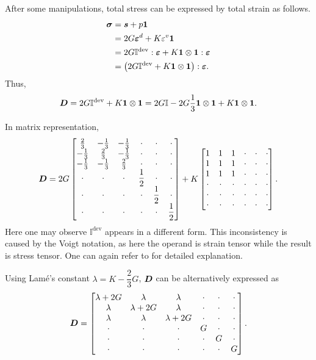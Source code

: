 After some manipulations, total stress can be expressed by total strain as follows.
\begin{gather}
\begin{split}
\bm{\sigma}&=\bm{s}+p\bm{1}\\
&=2G\bm{\varepsilon}^d+K\varepsilon^v\bm{1}\\
&=2G\mathbb{I}^\text{dev}:\bm{\varepsilon}+K\bm{1}\otimes\bm{1}:\bm{\varepsilon}\\
&=\left(2G\mathbb{I}^\text{dev}+K\bm{1}\otimes\bm{1}\right):\bm{\varepsilon}.
\end{split}
\end{gather}
Thus,
\begin{gather}
\bm{D}=2G\mathbb{I}^\text{dev}+K\bm{1}\otimes\bm{1}=2G\mathbb{I}-2G\dfrac{1}{3}\bm{1}\otimes\bm{1}+K\bm{1}\otimes\bm{1}.
\end{gather}

In matrix representation,
\begin{gather}
\bm{D}=2G\begin{bmatrix}
\frac{2}{3}&-\frac{1}{3}&-\frac{1}{3}&\cdot&\cdot&\cdot\\
-\frac{1}{3}&\frac{2}{3}&-\frac{1}{3}&\cdot&\cdot&\cdot\\
-\frac{1}{3}&-\frac{1}{3}&\frac{2}{3}&\cdot&\cdot&\cdot\\
\cdot&\cdot&\cdot&\dfrac{1}{2}&\cdot&\cdot\\
\cdot&\cdot&\cdot&\cdot&\dfrac{1}{2}&\cdot\\
\cdot&\cdot&\cdot&\cdot&\cdot&\dfrac{1}{2}
\end{bmatrix}+K\begin{bmatrix}
1&1&1&\cdot&\cdot&\cdot\\
1&1&1&\cdot&\cdot&\cdot\\
1&1&1&\cdot&\cdot&\cdot\\
\cdot&\cdot&\cdot&\cdot&\cdot&\cdot\\
\cdot&\cdot&\cdot&\cdot&\cdot&\cdot\\
\cdot&\cdot&\cdot&\cdot&\cdot&\cdot
\end{bmatrix}.
\end{gather}
Here one may observe $\mathbb{I}^\text{dev}$ appears in a different form. This inconsistency is caused by the Voigt notation, as here the operand is strain tensor while the result is stress tensor. One can again refer to \cite{Helnwein2001} for detailed explanation.

Using Lam\'{e}'s constant $\lambda=K-\dfrac{2}{3}G$, $\bm{D}$ can be alternatively expressed as
\begin{gather}
\bm{D}=\begin{bmatrix}
\lambda+2G&\lambda&\lambda&\cdot&\cdot&\cdot\\
\lambda&\lambda+2G&\lambda&\cdot&\cdot&\cdot\\
\lambda&\lambda&\lambda+2G&\cdot&\cdot&\cdot\\
\cdot&\cdot&\cdot&G&\cdot&\cdot\\
\cdot&\cdot&\cdot&\cdot&G&\cdot\\
\cdot&\cdot&\cdot&\cdot&\cdot&G
\end{bmatrix}.
\end{gather}
